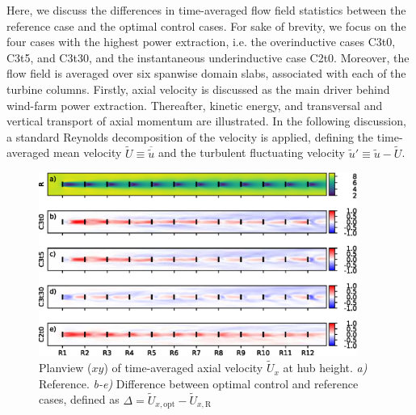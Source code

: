 	Here, we discuss the differences in time-averaged flow field statistics between the reference case and the optimal control cases. For sake of brevity, we focus on the four cases with the highest power extraction, i.e. the overinductive cases C3t0, C3t5, and C3t30, and the instantaneous underinductive case C2t0. Moreover, the flow field is averaged over six spanwise domain slabs, associated with each of the turbine columns. Firstly, axial velocity is discussed as the main driver behind wind-farm power extraction. Thereafter, kinetic energy, and transversal and vertical transport of axial momentum are illustrated. In the following discussion, a standard Reynolds decomposition of the velocity is applied, defining the time-averaged mean velocity $\widetilde{U} \equiv \overline{\widetilde{u}}$ and the turbulent fluctuating velocity $\widetilde{u}' \equiv  \widetilde{u} - \widetilde{U}$.

\begin{figure}[ht!]
	\centering
	\includegraphics[width=0.93\textwidth]{chapters/optimal_induction_control/topview_u.eps}
	\caption[Planview ($xy$) of time-averaged axial velocity $\widetilde{U}_x$ at hub height.]{Planview ($xy$) of time-averaged axial velocity $\widetilde{U}_x$ at hub height. \emph{a) } Reference. \emph{b-e)} Difference between optimal control and reference cases, defined as $\Delta = \widetilde{U}_{x,\text{opt}} - \widetilde{U}_{x,\text{R}}$  \label{fig:opt_ind_top_u}}
\end{figure}

